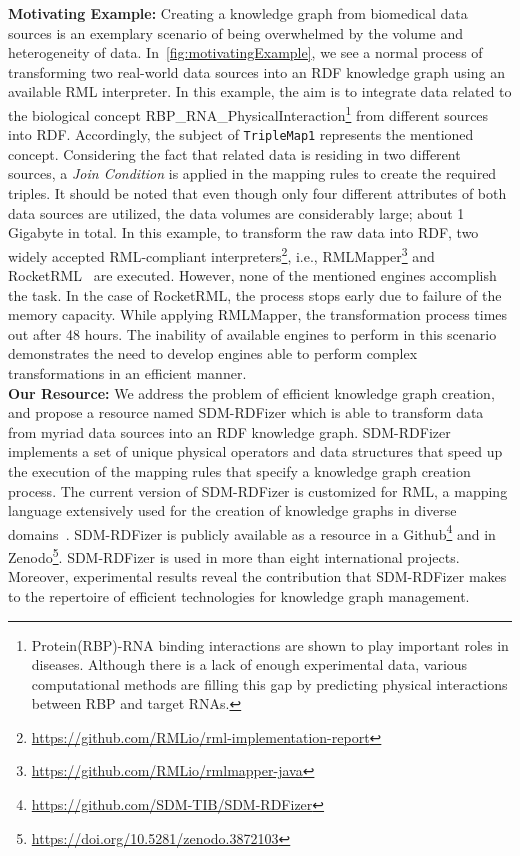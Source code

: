\noindent \textbf{Motivating Example:}
Creating a knowledge graph from biomedical data sources is an exemplary scenario of being overwhelmed by the volume and heterogeneity of data. 
In~\autoref{fig:motivatingExample}, we see a normal process of transforming two real-world data sources into an RDF knowledge graph using an available RML interpreter. 
In this example, the aim is to integrate data related to the biological concept RBP\_RNA\_PhysicalInteraction\footnote{Protein(RBP)-RNA binding interactions are shown to play important roles in diseases.
Although there is a lack of enough experimental data, various computational methods are filling this gap by predicting physical interactions between RBP and target RNAs.} from different sources into RDF. 
Accordingly, the subject of \texttt{TripleMap1} represents the mentioned concept. 
Considering the fact that related data is residing in two different sources, a \textit{Join Condition} is applied in the mapping rules to create the required triples. 
It should be noted that even though only four different attributes of both data sources are utilized, the data volumes are considerably large; about 1 Gigabyte in total. 
In this example, to transform the raw data into RDF, two widely accepted RML-compliant interpreters\footnote{\url{https://github.com/RMLio/rml-implementation-report}}, i.e., RMLMapper\footnote{\url{https://github.com/RMLio/rmlmapper-java}} and RocketRML~\citep{csimcsek2019rocketrml} are executed. 
However, none of the mentioned engines accomplish the task. 
In the case of RocketRML, the process stops early due to failure of the memory capacity. 
While applying RMLMapper, the transformation process times out after 48 hours. 
The inability of available engines to perform in this scenario demonstrates the need to develop engines able to perform complex transformations in an efficient manner.
\\
\textbf{Our Resource:} We address the problem of efficient knowledge graph creation, and propose a resource named SDM-RDFizer which is able to transform data from myriad data sources into an RDF knowledge graph. SDM-RDFizer implements a set of unique physical operators and data structures that speed up the execution of the mapping rules that specify a knowledge graph creation process. The current version of SDM-RDFizer is customized for RML, a mapping language extensively used for the creation of knowledge graphs in diverse domains~\citep{dimou2014rml}.    
SDM-RDFizer is publicly available as a resource in a Github\footnote{\url{https://github.com/SDM-TIB/SDM-RDFizer}} and in Zenodo\footnote{\url{https://doi.org/10.5281/zenodo.3872103}}. SDM-RDFizer is used in more than eight international projects. Moreover, experimental results reveal the contribution that SDM-RDFizer makes to the repertoire of efficient technologies for knowledge graph management.  \\
